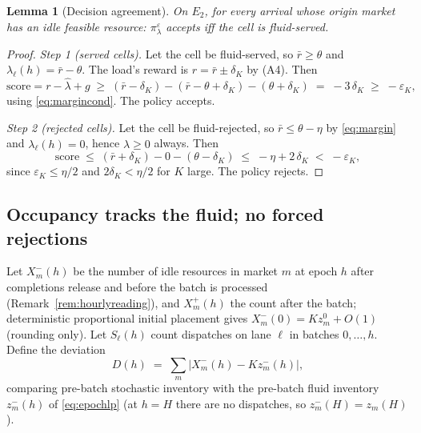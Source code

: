 \documentclass[11pt]{article}
\newtheorem{lemma}{Lemma}
\newcommand{\pol}{\pi_{\lambda}}
\begin{document}
\begin{lemma}[Decision agreement]
\label{lem:agree}
On $E_2$, for every arrival whose origin market has
an idle feasible resource: $\pol^{\varepsilon}$ accepts iff the cell is
fluid-served.
\end{lemma}

\begin{proof}
\emph{Step 1 (served cells).} Let the cell be fluid-served, so
$\bar{r} \geq \theta$ and $\lambda_{\ell}(h) = \bar{r} - \theta$. The
load's reward is $r = \bar{r} \pm \delta_K$ by (A4). Then
\begin{equation}
  \mathrm{score}
  = r - \hat{\lambda} + g
  \;\geq\; (\bar{r} - \delta_K) - (\bar{r} - \theta + \delta_K)
  - (\theta + \delta_K)
  \;=\; -3\,\delta_K
  \;\geq\; -\varepsilon_K,
\end{equation}
using \eqref{eq:margincond}. The policy accepts.

\emph{Step 2 (rejected cells).} Let the cell be fluid-rejected, so
$\bar{r} \leq \theta - \eta$ by \eqref{eq:margin} and
$\lambda_{\ell}(h) = 0$, hence $\hat{\lambda} \geq 0$ always. Then
\begin{equation}
  \mathrm{score}
  \;\leq\; (\bar{r} + \delta_K) - 0 - (\theta - \delta_K)
  \;\leq\; -\eta + 2\,\delta_K
  \;<\; -\varepsilon_K,
\end{equation}
since $\varepsilon_K \leq \eta/2$ and $2\delta_K < \eta/2$ for $K$
large. The policy rejects.
\end{proof}

\subsection{Occupancy tracks the fluid; no forced rejections}

Let $X^{-}_m(h)$ be the number of idle resources in market $m$ at
epoch $h$ after completions release and before the batch is processed
(Remark~\ref{rem:hourlyreading}), and $X^{+}_m(h)$ the count after
the batch; deterministic proportional initial placement gives
$X^{-}_m(0) = K z^0_m + O(1)$ (rounding only). Let $S_{\ell}(h)$
count dispatches on lane $\ell$ in batches $0, \dots, h$. Define the
deviation
\begin{equation}
  D(h) \;=\; \sum_{m} \bigl| X^{-}_m(h) - K z^{-}_m(h) \bigr|,
\end{equation}
comparing pre-batch stochastic inventory with the pre-batch fluid
inventory $z^{-}_m(h)$ of \eqref{eq:epochlp} (at $h = H$ there are
no dispatches, so $z^{-}_m(H) = z_m(H)$).
\end{document}
